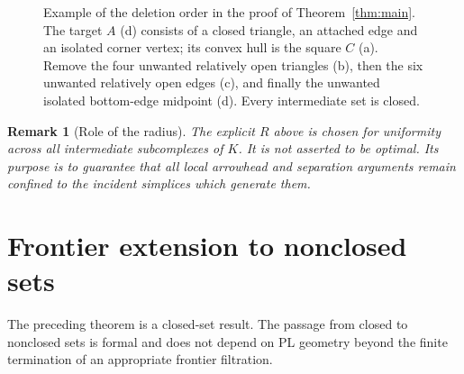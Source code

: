 \documentclass[11pt]{article}
\newtheorem{remark}[theorem]{Remark}
\numberwithin{equation}{section}
\begin{document}
\begin{figure}[!htbp]
\caption{Example of the deletion order in the proof of Theorem~\ref{thm:main}. The target $A$ (d) consists of a closed triangle, an attached edge and an isolated corner vertex; its convex hull is the square $C$ (a). Remove the four unwanted relatively open triangles (b), then the six unwanted relatively open edges (c), and finally the unwanted isolated bottom-edge midpoint (d). Every intermediate set is closed.}
\label{fig:deletion-induction}
\end{figure}

\begin{remark}[Role of the radius]\label{rem:radius}
The explicit $R$ above is chosen for uniformity across all intermediate subcomplexes of $K$. It is not asserted to be optimal. Its purpose is to guarantee that all local arrowhead and separation arguments remain confined to the incident simplices which generate them.
\end{remark}
 \section{Frontier extension to nonclosed sets}\label{sec:frontier}

The preceding theorem is a closed-set result. The passage from closed to nonclosed sets is formal and does not depend on PL geometry beyond the finite termination of an appropriate frontier filtration.
\end{document}
